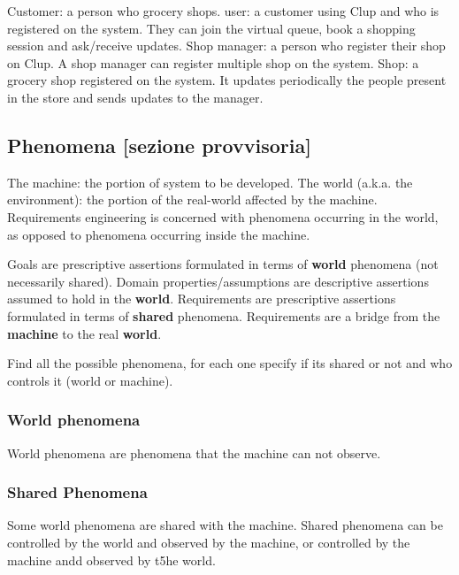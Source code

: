 Customer: a person who grocery shops.
user: a customer using Clup and who is registered on the system. They can join the virtual queue, book a shopping session and ask/receive updates.
Shop manager: a person who register their shop on Clup. A shop manager can register multiple shop on the system.
Shop: a grocery shop registered on the system. It updates periodically the people present in the store and sends updates to the manager.

\subsection{Phenomena [sezione provvisoria]}
\label{subsect:phenomena}

The machine: the portion of system to be developed.
The world (a.k.a. the environment): the portion of the real-world affected by the machine.
Requirements engineering is concerned with phenomena occurring in the world, as opposed to phenomena occurring inside the machine.

Goals are prescriptive assertions formulated in terms of \textbf{world} phenomena (not necessarily shared).
Domain properties/assumptions are descriptive assertions assumed to hold in the \textbf{world}.
Requirements are prescriptive assertions formulated in terms of \textbf{shared} phenomena.
Requirements are a bridge from the \textbf{machine} to the real \textbf{world}.

Find all the possible phenomena, for each one specify if its shared or not and who controls it (world or machine). 

\subsubsection{World phenomena}
\label{subsubsect:worldphenomena}

World phenomena are phenomena that the machine can not observe.

\subsubsection{Shared Phenomena}
\label{subsubsect:sharedphenomena}

Some world phenomena are shared with the machine.
Shared phenomena can be controlled by the world and observed by the machine, or controlled by the machine andd observed by t5he world.
